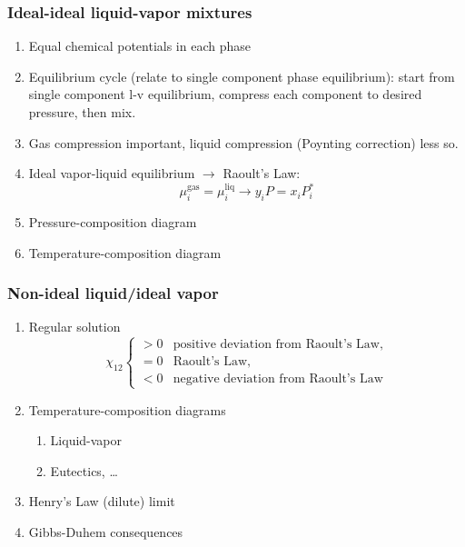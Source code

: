 \documentclass[11pt]{article}
\begin{document}
\subsubsection{Ideal-ideal liquid-vapor mixtures}
\label{sec:org1478b09}
\begin{enumerate}
\item Equal chemical potentials in each phase
\item Equilibrium cycle (relate to single component phase equilibrium): start from single component l-v equilibrium, compress each component to desired pressure, then mix.
\item Gas compression important, liquid compression (Poynting correction) less so.
\item Ideal vapor-liquid equilibrium \(\rightarrow\) Raoult's Law:
\begin{equation*}
  \mu_i^\text{gas} = \mu_i^\text{liq} \rightarrow y_i P = x_i P_i^*
\end{equation*}
\item Pressure-composition diagram
\item Temperature-composition diagram
\end{enumerate}

\subsubsection{Non-ideal liquid/ideal vapor}
\label{sec:org2f8099e}
\begin{enumerate}
\item Regular solution
   \begin{equation*}
  \chi_{12} \left \{
   \begin{array}{rl}
     > 0 & \text{positive deviation from Raoult's Law,}\\
     = 0 & \text{Raoult's Law,}\\
     <0 & \text{negative deviation from Raoult's Law}
    \end{array} \right .
\end{equation*}
\item Temperature-composition diagrams
\begin{enumerate}
\item Liquid-vapor
\item Eutectics, \ldots{}
\end{enumerate}
\item Henry's Law (dilute) limit
\item Gibbs-Duhem consequences
\end{enumerate}
\end{document}
